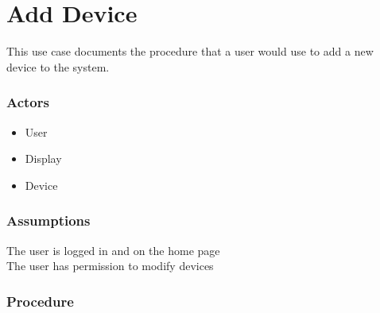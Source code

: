 \section{Add Device}

This use case documents the procedure that a user would use to add a new device to the system. 

\subsubsection{Actors}
\begin{itemize}
	\item User
	\item Display
	\item Device
\end{itemize}

\subsubsection{Assumptions}

The user is logged in and on the home page\\
The user has permission to modify devices

\subsubsection{Procedure}

